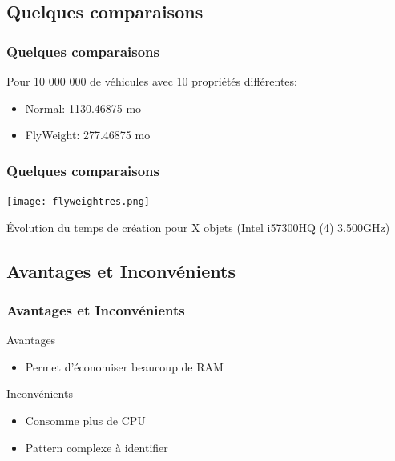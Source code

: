 \documentclass{beamer}
\begin{document}

\subsection{Quelques comparaisons}

\begin{frame}
\frametitle{Quelques comparaisons}

\begin{block}{}
Pour 10 000 000 de véhicules avec 10 propriétés différentes:

\begin{itemize}
    \item Normal: 1130.46875 mo
    \item FlyWeight: 277.46875 mo
\end{itemize}

\end{block}
\end{frame}


\begin{frame}
\frametitle{Quelques comparaisons}

\begin{center}
    \texttt{[image: flyweightres.png]}
\end{center}
    Évolution du temps de création pour X objets (Intel i5\-7300HQ (4) \@ 3.500GHz)

\end{frame}


\subsection{Avantages et Inconvénients}

\begin{frame}
\frametitle{Avantages et Inconvénients}

\begin{block}{Avantages}

\begin{itemize}
\item Permet d'économiser beaucoup de RAM
\end{itemize}
\end{block}

\begin{block}{Inconvénients}
\begin{itemize}
\item Consomme plus de CPU
\item Pattern complexe à identifier

\end{itemize}{}

\end{block}
\end{frame}
\end{document}
